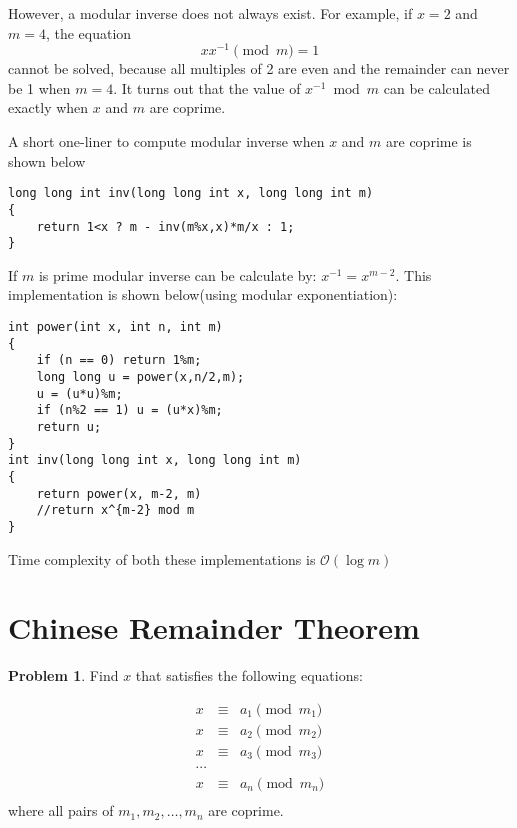 \documentclass[twoside,12pt,a4paper,english]{book}
\theoremstyle{definition}
\theoremstyle{problemstyle}
\newtheorem*{problem}{Problem} %
\theoremstyle{problemstyle}
\theoremstyle{problemstyle}
\begin{document}
However, a modular inverse does not always exist.
For example, if $x=2$ and $m=4$, the equation
\[ x x^{-1} \pmod{m} = 1 \]
cannot be solved, because all multiples of 2
are even and the remainder can never be 1 when $m=4$.
It turns out that the value of $x^{-1} \bmod m$
can be calculated exactly when $x$ and $m$ are coprime.

A short one-liner to compute modular inverse when $x$ and $m$ are coprime is shown below
\begin{lstlisting}
long long int inv(long long int x, long long int m)
{
    return 1<x ? m - inv(m%x,x)*m/x : 1;
}
\end{lstlisting}
If $m$ is prime modular inverse can be calculate by: $x^{-1} = x^{m-2}$. This implementation is shown below(using modular exponentiation):

\begin{lstlisting}
int power(int x, int n, int m)
{
    if (n == 0) return 1%m;
    long long u = power(x,n/2,m);
    u = (u*u)%m;
    if (n%2 == 1) u = (u*x)%m;
    return u;
}
int inv(long long int x, long long int m)
{
    return power(x, m-2, m)
    //return x^{m-2} mod m
}
\end{lstlisting}

Time complexity of both these implementations is $\mathcal{O}(\log{m})$
\newpage
\section{Chinese Remainder Theorem}
\begin{problem}
Find $x$ that satisfies the following equations:

\[
\begin{array}{lcl}
x & \equiv & a_1 \pmod{m_1} \\
x & \equiv & a_2 \pmod{m_2} \\
x & \equiv & a_3 \pmod{m_3} \\
\cdots \\
x & \equiv & a_n \pmod{m_n} \\
\end{array}
\]
where all pairs of $m_1,m_2,\ldots,m_n$ are coprime.  
\end{problem}
\end{document}
